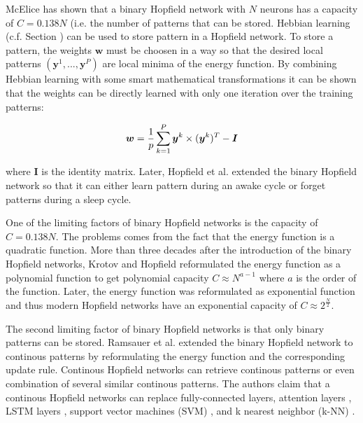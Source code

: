 McElice  has shown that a binary Hopfield network with \(N\) neurons has a capacity of \(C=0.138N\) (i.e. the number of patterns that can be stored.
Hebbian learning (c.f. Section ) can be used to store pattern in a Hopfield network.
To store a pattern, the weights \(\boldsymbol{w}\) must be choosen in a way so that the desired local patterns \((\boldsymbol{y}^1, ..., \boldsymbol{y}^P)\) are local minima of the energy function.
By combining Hebbian learning with some smart mathematical transformations it can be shown that the weights can be directly learned with only one iteration over the training patterns:

\begin{equation}\eqlbl{hf_5}
	\boldsymbol{w} = \frac{1}{p} \sum_{k=1}^{P} \boldsymbol{y}^k \times (\boldsymbol{y}^k)^T - \boldsymbol{I}
\end{equation}

where \(\boldsymbol{I}\) is the identity matrix.
Later, Hopfield et al.  extended the binary Hopfield network so that it can either learn pattern during an awake cycle or forget patterns during a sleep cycle.

One of the limiting factors of binary Hopfield networks is the capacity of \(C=0.138N\).
The problems comes from the fact that the energy function is a quadratic function.
More than three decades after the introduction of the binary Hopfield networks, Krotov and Hopfield  reformulated the energy function as a polynomial function to get polynomial capacity \(C\approx N^{a-1}\) where \(a\) is the order of the function.
Later, the energy function was reformulated as exponential function  and thus modern Hopfield networks have an exponential capacity of \(C\approx 2^{\frac{N}{2}}\).

The second limiting factor of binary Hopfield networks is that only binary patterns can be stored.
Ramsauer et al.  extended the binary Hopfield network to continous patterns by reformulating the energy function and the corresponding update rule.
Continous Hopfield networks can retrieve continous patterns or even combination of several similar continous patterns.
The authors claim that a continous Hopfield networks can replace fully-connected layers, attention layers \cite{10.5555/2969033.2969073}, LSTM layers \cite{Hochreiter_Schmidhuber_1997}, support vector machines (SVM) \cite{Cortes_Vapnik_1995}, and k nearest neighbor (k-NN) \cite{Cover_Hart_1967}.


